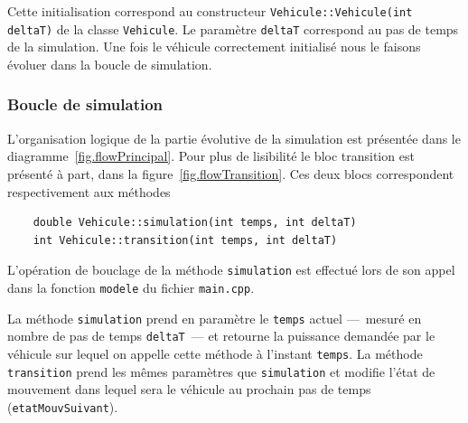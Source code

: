			Cette initialisation correspond au constructeur \verb|Vehicule::Vehicule(int deltaT)| de la classe \verb|Vehicule|. Le paramètre \lstinline{deltaT} correspond au pas de temps de la simulation. Une fois le véhicule correctement initialisé nous le faisons évoluer dans la boucle de simulation.
	
		\subsubsection{Boucle de simulation \label{sec.descrSimulation}}
			
			L'organisation logique de la partie évolutive de la simulation est présentée dans le diagramme~\vref{fig.flowPrincipal}. Pour plus de lisibilité le bloc transition est présenté à part, dans la figure~\vref{fig.flowTransition}. Ces deux blocs correspondent respectivement aux méthodes \begin{lstlisting}
    double Vehicule::simulation(int temps, int deltaT)
    int Vehicule::transition(int temps, int deltaT)
			\end{lstlisting}
			L'opération de bouclage de la méthode \lstinline{simulation} est effectué lors de son appel dans la fonction \lstinline{modele} du fichier \lstinline|main.cpp|.
			
			La méthode \lstinline{simulation} prend en paramètre le \lstinline{temps} actuel ---~mesuré en nombre de pas de temps \lstinline{deltaT}~--- et retourne la puissance demandée par le véhicule sur lequel on appelle cette méthode à l'instant \lstinline{temps}.
			La méthode \lstinline{transition} prend les mêmes paramètres que \lstinline{simulation} et modifie l'état de mouvement dans lequel sera le véhicule au prochain pas de temps (\lstinline{etatMouvSuivant}).
			
